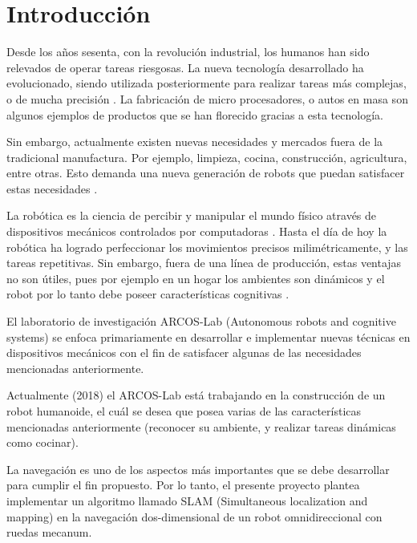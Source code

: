  \chapter{Introducción}
\label{C:introduccion}



Desde los años sesenta, con la revolución industrial, los humanos han sido relevados de operar tareas riesgosas. La nueva tecnología desarrollado ha evolucionado, siendo utilizada posteriormente para realizar tareas más complejas, o de mucha precisión \cite{Garcia2007}. La fabricación de micro procesadores, o autos en masa son algunos ejemplos de productos que se han florecido gracias a esta tecnología.

Sin embargo, actualmente existen nuevas necesidades y mercados fuera de la tradicional manufactura. Por ejemplo, limpieza, cocina, construcción, agricultura, entre otras. Esto demanda una nueva generación de robots que puedan satisfacer estas necesidades \cite{Garcia2007}.

La robótica es la ciencia de percibir y manipular el mundo físico através de dispositivos mecánicos controlados por computadoras \cite{Thrun2005}. Hasta el día de hoy la robótica ha logrado perfeccionar los movimientos precisos milimétricamente, y las tareas repetitivas. Sin embargo, fuera de una línea de producción, estas ventajas no son útiles, pues por ejemplo en un hogar los ambientes son dinámicos y el robot por lo tanto debe poseer características cognitivas \cite{HelioAzevedoRenatoArcherITCenterandICM/USPJosePedroR.InstituteofMathematicalandComputerSciences2017}. 

El laboratorio de investigación ARCOS-Lab (Autonomous robots and cognitive systems) se enfoca primariamente en desarrollar e implementar nuevas técnicas en dispositivos mecánicos con el fin de satisfacer algunas de las necesidades mencionadas anteriormente.

Actualmente (2018) el ARCOS-Lab está trabajando en la construcción de un robot humanoide, el cuál se desea que posea varias de las características mencionadas anteriormente (reconocer su ambiente, y realizar tareas dinámicas como cocinar).

La navegación es uno de los aspectos más importantes que se debe desarrollar para cumplir el fin propuesto. Por lo tanto, el presente proyecto plantea implementar un algoritmo llamado SLAM (Simultaneous localization and mapping) en la navegación dos-dimensional de un robot omnidireccional con ruedas mecanum. 


